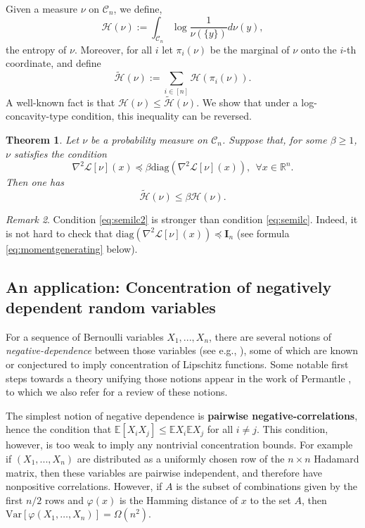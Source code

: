 \documentclass[12pt]{article}
\def \RR {\mathbb R}
\def \EE {\mathbb E}
\def \Var {\mathrm{Var}}
\def \DC {\mathcal{C}_n}
\def \Id {\mathbf{I}_n}
\newtheorem{theorem}{Theorem}
\theoremstyle{definition}
\theoremstyle{remark}
\newtheorem{remark}[theorem]{Remark}
\begin{document}
Given a measure $\nu$ on $\DC$, we define,
$$
\mathcal{H}(\nu) := \int_{\DC} \log \frac{1}{\nu(\{y\})} d\nu(y),
$$
the entropy of $\nu$. Moreover, for all $i$ let $\pi_i(\nu)$ be the marginal of $\nu$ onto the $i$-th coordinate, and define
$$
\tilde {\mathcal{H}}(\nu) := \sum_{i \in [n]} \mathcal{H}(\pi_i(\nu)).
$$
A well-known fact is that $\mathcal{H}(\nu) \leq \tilde {\mathcal{H}}(\nu)$. We show that under a log-concavity-type condition, this inequality can be reversed. 
\begin{theorem} \label{thm:entropy}
Let $\nu$ be a probability measure on $\DC$. Suppose that, for some $\beta \geq 1$, $\nu$ satisfies the condition
\begin{equation}\label{eq:semilc2}
\nabla^2 \mathcal{L}[\nu](x) \preceq \beta \mathrm{diag}\left ( \nabla^2 \mathcal{L}[\nu](x) \right) , ~~ \forall x \in \RR^n.
\end{equation}
Then one has
$$
\tilde {\mathcal{H}}(\nu) \leq \beta \mathcal{H}(\nu).
$$
\end{theorem}
\begin{remark}
Condition \eqref{eq:semilc2} is stronger than condition \eqref{eq:semilc}. Indeed, it is not hard to check that $\mathrm{diag}\left ( \nabla^2 \mathcal{L}[\nu](x) \right) \preceq \Id$ (see formula \eqref{eq:momentgenerating} below).
\end{remark}

\subsection{An application: Concentration of negatively dependent random variables}
For a sequence of Bernoulli variables $X_1,...,X_n$, there are several notions of \emph{negative-dependence} between those variables (see e.g., \cite{BSS82,BK85,BF87,DR98}), some of which are known or conjectured to imply concentration of Lipschitz functions. Some notable first steps towards a theory unifying those notions appear in the work of Permantle \cite{pemantle04}, to which we also refer for a review of these notions.

The simplest notion of negative dependence is \textbf{pairwise negative-correlations}, hence the condition that $\EE[X_i X_j] \leq \EE X_i \EE X_j$ for all $i \neq j$. This condition, however, is too weak to imply any nontrivial concentration bounds. For example if $(X_1,...,X_n)$ are distributed as a uniformly chosen row of the $n \times n$ Hadamard matrix, then these variables are pairwise independent, and therefore have nonpositive correlations. However, if $A$ is the subset of combinations given by the first $n/2$ rows and $\varphi(x)$ is the Hamming distance of $x$ to the set $A$, then $\Var[ \varphi(X_1,\dots,X_n)] = \Omega \left (n^2 \right )$. 
\end{document}

